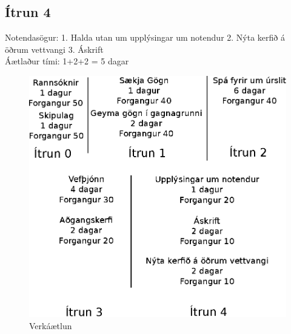 \documentclass[a4paper,11pt]{article}
\begin{document}
\subsection{Ítrun 4}
Notendasögur: 1. Halda utan um upplýsingar um notendur 2. Nýta kerfið á öðrum vettvangi 3. Áskrift\\
Áætlaður tími: 1+2+2 = 5 dagar
\begin{figure}[H]
  \centering
  \includegraphics{verkaetlunarmynd}
  \caption{Verkáætlun}
  \label{fig:verkaetlun}
\end{figure}
\end{document}

